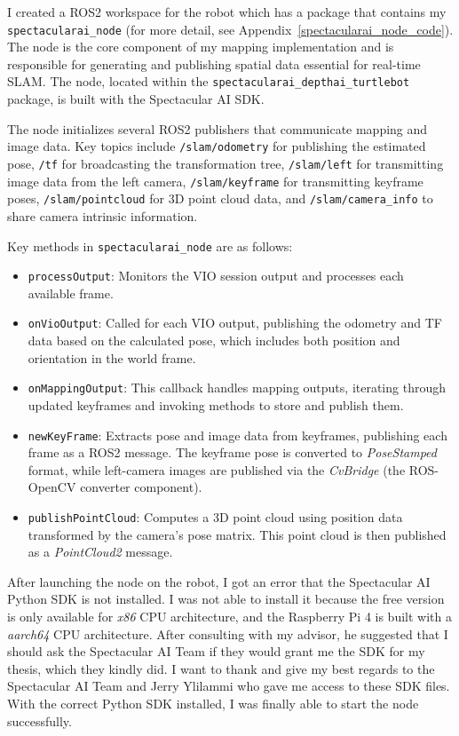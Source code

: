 I created a ROS2 workspace for the robot which has a package that contains my \verb|spectacularai_node| (for more detail, see Appendix~\ref{spectacularai_node_code}). The node is the core component of my mapping implementation and is responsible for generating and publishing spatial data essential for real-time SLAM. The node, located within the \verb|spectacularai_depthai_turtlebot| package, is built with the Spectacular AI SDK.

The node initializes several ROS2 publishers that communicate mapping and image data. Key topics include \verb|/slam/odometry| for publishing the estimated pose, \verb|/tf| for broadcasting the transformation tree, \verb|/slam/left| for transmitting image data from the left camera, \verb|/slam/keyframe| for transmitting keyframe poses, \verb|/slam/pointcloud| for 3D point cloud data, and \verb|/slam/camera_info| to share camera intrinsic information.

Key methods in \verb|spectacularai_node| are as follows:
\begin{itemize}
    \item \verb|processOutput|: Monitors the VIO session output and processes each available frame.
    \item \verb|onVioOutput|: Called for each VIO output, publishing the odometry and TF data based on the calculated pose, which includes both position and orientation in the world frame.
    \item \verb|onMappingOutput|: This callback handles mapping outputs, iterating through updated keyframes and invoking methods to store and publish them.
    \item \verb|newKeyFrame|: Extracts pose and image data from keyframes, publishing each frame as a ROS2 message. The keyframe pose is converted to \textit{PoseStamped} format, while left-camera images are published via the \textit{CvBridge} (the ROS-OpenCV converter component).
    \item \verb|publishPointCloud|: Computes a 3D point cloud using position data transformed by the camera’s pose matrix. This point cloud is then published as a \textit{PointCloud2} message.
\end{itemize}

After launching the node on the robot, I got an error that the Spectacular AI Python SDK is not installed. I was not able to install it because the free version is only available for \textit{x86} CPU architecture, and the Raspberry Pi 4 is built with a \textit{aarch64} CPU architecture. After consulting with my advisor, he suggested that I should ask the Spectacular AI Team if they would grant me the SDK for my thesis, which they kindly did. I want to thank and give my best regards to the Spectacular AI Team and Jerry Ylilammi who gave me access to these SDK files. With the correct Python SDK installed, I was finally able to start the node successfully.

